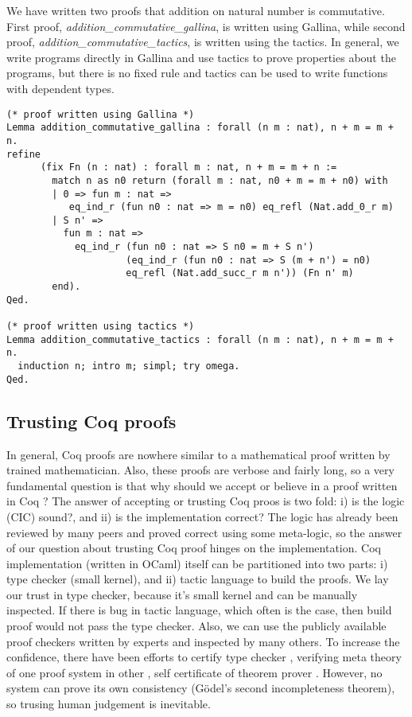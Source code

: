  We have written two proofs that addition on natural number is commutative. 
 First proof, \textit{addition\_commutative\_gallina}, is written using 
 Gallina, while second proof, \textit{addition\_commutative\_tactics}, is written 
 using the tactics.  In general, we write programs directly in Gallina and use tactics 
 to prove properties about the programs, but there is no fixed rule and tactics 
 can be used to write functions with dependent types.
\begin{verbatim}
(* proof written using Gallina *)
Lemma addition_commutative_gallina : forall (n m : nat), n + m = m + n.
refine
      (fix Fn (n : nat) : forall m : nat, n + m = m + n :=
        match n as n0 return (forall m : nat, n0 + m = m + n0) with
        | 0 => fun m : nat => 
           eq_ind_r (fun n0 : nat => m = n0) eq_refl (Nat.add_0_r m)
        | S n' =>
          fun m : nat =>
            eq_ind_r (fun n0 : nat => S n0 = m + S n')
                     (eq_ind_r (fun n0 : nat => S (m + n') = n0) 
                     eq_refl (Nat.add_succ_r m n')) (Fn n' m)
        end).
Qed.

(* proof written using tactics *)
Lemma addition_commutative_tactics : forall (n m : nat), n + m = m + n.
  induction n; intro m; simpl; try omega.
Qed.
\end{verbatim}



 \subsection{Trusting Coq proofs}
 \label{sec:coqproof}
  In general, Coq proofs are nowhere similar to a mathematical 
  proof written by trained mathematician. Also, these proofs 
  are verbose and fairly long, so a 
  very fundamental question is that why should we 
  accept or believe in a proof written in Coq \citep{pollack1998believe}?  The answer of 
	accepting or trusting Coq proos is two fold:
  i) is the logic (CIC) sound?, and ii) is the implementation correct?
  The logic has already been reviewed by many peers and proved correct 
  using some meta-logic, so the answer of our question about trusting Coq proof 
  hinges on the implementation. 
  Coq implementation (written in OCaml) itself can be partitioned into two parts: 
  i) type checker (small kernel), 
  and ii) tactic language to build the proofs.
  We lay our trust in type checker, because it's small kernel and can be 
  manually inspected. If there
  is bug in tactic language, which often is the case, then build proof would 
  not pass the type checker.  Also, we can use the publicly available proof 
  checkers written by experts and inspected by many others. To increase the 
  confidence, there have been 
  efforts to certify type checker \citep{Appel2003}
  \citep{barras1996coq}, verifying meta theory of one proof system 
  in other \citep{10.1007/978-3-319-08970-6_3}, self certificate of 
  theorem prover \citep{10.1007/11814771_17}. However, no system can 
  prove its own consistency (G{\"o}del's second incompleteness theorem), so
  trusing human judgement is inevitable. 
  
